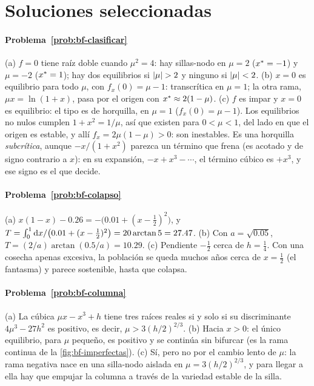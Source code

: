 \section{Soluciones seleccionadas}

\paragraph{Problema~\ref{prob:bf-clasificar}}
(a) $f=0$ tiene raíz doble cuando $\mu^2=4$: hay sillas-nodo en $\mu=2$ ($x^{*}=-1$) y $\mu=-2$ ($x^{*}=1$); hay dos equilibrios si $\left\lvert \mu\right\rvert>2$ y ninguno si $\left\lvert \mu\right\rvert<2$. (b) $x=0$ es equilibrio para todo $\mu$, con $f_x(0)=\mu-1$: transcrítica en $\mu=1$; la otra rama, $\mu x=\ln(1+x)$, pasa por el origen con $x^{*}\approx2(1-\mu)$. (c) $f$ es impar y $x=0$ es equilibrio: el tipo es de horquilla, en $\mu=1$ ($f_x(0)=\mu-1$). Los equilibrios no nulos cumplen $1+x^2=1/\mu$, así que existen para $0<\mu<1$, del lado en que el origen es estable, y allí $f_x=2\mu(1-\mu)>0$: son inestables. Es una horquilla \emph{subcrítica}, aunque $-x/(1+x^2)$ parezca un término que frena (es acotado y de signo contrario a $x$): en su expansión, $-x+x^3-\cdots$, el término cúbico es $+x^3$, y ese signo es el que decide.

\paragraph{Problema~\ref{prob:bf-colapso}}
(a) $x(1-x)-0.26=-\bigl(0.01+(x-\tfrac12)^2\bigr)$, y $T=\int_0^1\mathrm{d} x/\bigl(0.01+(x-\tfrac12)^2\bigr)=20\arctan5=27.47$. (b) Con $a=\sqrt{0.05}$, $T=(2/a)\arctan(0.5/a)=10.29$. (c) Pendiente $-\tfrac12$ cerca de $h=\tfrac14$. Con una cosecha apenas excesiva, la población se queda muchos años cerca de $x=\tfrac12$ (el fantasma) y parece sostenible, hasta que colapsa.

\paragraph{Problema~\ref{prob:bf-columna}}
(a) La cúbica $\mu x-x^3+h$ tiene tres raíces reales si y solo si su discriminante $4\mu^3-27h^2$ es positivo, es decir, $\mu>3(h/2)^{2/3}$. (b) Hacia $x>0$: el único equilibrio, para $\mu$ pequeño, es positivo y se continúa sin bifurcar (es la rama continua de la \cref{fig:bf-imperfectas}). (c) Sí, pero no por el cambio lento de $\mu$: la rama negativa nace en una silla-nodo aislada en $\mu=3(h/2)^{2/3}$, y para llegar a ella hay que empujar la columna a través de la variedad estable de la silla.

